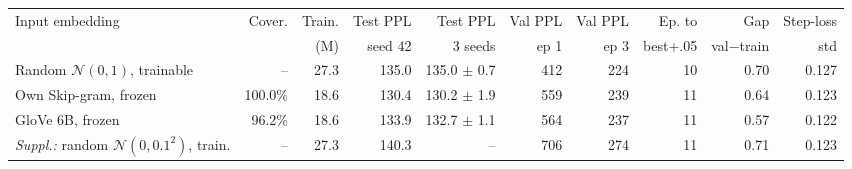 \begin{tabular}{lrrrrrrrrr}
\toprule
Input embedding & Cover. & Train. & Test PPL & Test PPL & Val PPL & Val PPL & Ep. to & Gap & Step-loss \\
 & & (M) & seed 42 & 3 seeds & ep 1 & ep 3 & best+.05 & val$-$train & std \\
\midrule
Random $\mathcal{N}(0,1)$, trainable & -- & 27.3 & 135.0 & 135.0 $\pm$ 0.7 & 412 & 224 & 10 & 0.70 & 0.127 \\
Own Skip-gram, frozen & 100.0\% & 18.6 & 130.4 & 130.2 $\pm$ 1.9 & 559 & 239 & 11 & 0.64 & 0.123 \\
GloVe 6B, frozen & 96.2\% & 18.6 & 133.9 & 132.7 $\pm$ 1.1 & 564 & 237 & 11 & 0.57 & 0.122 \\
\textit{Suppl.:} random $\mathcal{N}(0,0.1^2)$, train. & -- & 27.3 & 140.3 & -- & 706 & 274 & 11 & 0.71 & 0.123 \\
\bottomrule
\end{tabular}
